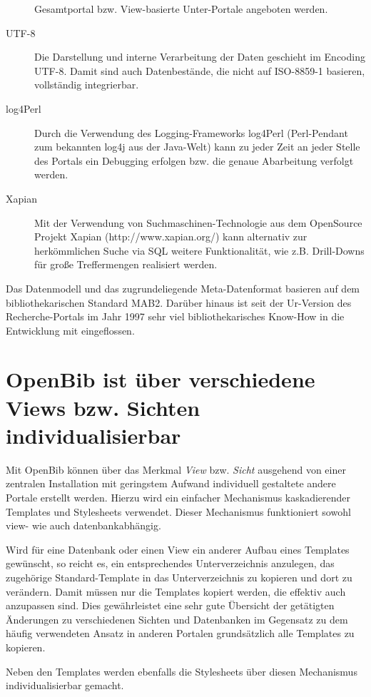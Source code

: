 \documentclass[11pt, twoside, a4paper, BCOR8mm, DIV12, bibtotoc,idxtotoc]{scrbook}
\begin{document}
\begin{description}
  Gesamtportal bzw. View-basierte Unter-Portale angeboten werden.
\item[UTF-8] Die Darstellung und interne Verarbeitung der Daten
  geschieht im Encoding UTF-8. Damit sind auch Datenbestände, die
  nicht auf ISO-8859-1 basieren, vollständig integrierbar.
\item[log4Perl] Durch die Verwendung des Logging-Frameworks log4Perl
  (Perl-Pendant zum bekannten log4j aus der Java-Welt) kann zu
  jeder Zeit an jeder Stelle des Portals ein Debugging erfolgen
  bzw. die genaue Abarbeitung verfolgt werden.
\item[Xapian] Mit der Verwendung von Suchmaschinen-Technologie aus dem
  OpenSource Projekt Xapian (http://www.xapian.org/) kann alternativ
  zur herkömmlichen Suche via SQL weitere Funk\-tio\-na\-li\-tät, wie
  z.B. Drill-Downs für große Treffermengen realisiert werden.
\end{description}

Das Datenmodell und das zugrundeliegende Meta-Datenformat basieren auf
dem biblio\-the\-ka\-ri\-schen Standard MAB2. Darüber hinaus ist seit der
Ur-Version des Recherche-Portals im Jahr 1997 sehr viel
bibliothekarisches Know-How in die Entwicklung mit eingeflossen.


\section{OpenBib ist über verschiedene Views bzw. Sichten individualisierbar}
Mit OpenBib können über das Merkmal \textit{View}
bzw. \textit{Sicht} ausgehend von einer zentralen In\-stal\-la\-tion mit
geringstem Aufwand individuell gestaltete andere Portale erstellt
werden. Hierzu wird ein einfacher Mechanismus kaskadierender Templates
und Stylesheets verwendet. Dieser Mechanismus funktioniert sowohl
view- wie auch datenbankabhängig. 

Wird für eine Datenbank oder einen View ein anderer Aufbau eines
Templates gewünscht, so reicht es, ein entsprechendes
Unterverzeichnis anzulegen, das zugehörige Standard-Template in das
Unterverzeichnis zu kopieren und dort zu verändern. Damit müssen nur
die Templates kopiert werden, die effektiv auch anzupassen sind. Dies
gewährleistet eine sehr gute Übersicht der getätigten Änderungen
zu verschiedenen Sichten und Datenbanken im Gegensatz zu dem häufig
verwendeten Ansatz in anderen Portalen grundsätzlich alle Templates
zu kopieren.

Neben den Templates werden ebenfalls die Stylesheets über diesen
Mechanismus individualisierbar gemacht.
\end{document}
